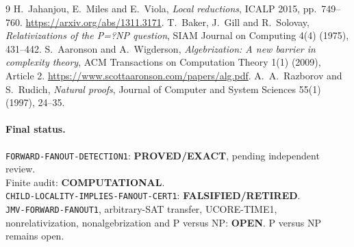 \documentclass[11pt]{article}
\newcommand{\EXACT}{\textbf{PROVED/EXACT}}
\newcommand{\OPEN}{\textbf{OPEN}}
\newcommand{\RETIRED}{\textbf{FALSIFIED/RETIRED}}
\newcommand{\COMP}{\textbf{COMPUTATIONAL}}
\begin{document}
\begin{thebibliography}{9}
 H.~Jahanjou, E.~Miles and E.~Viola,
\emph{Local reductions}, ICALP 2015, pp.~749--760.
\url{https://arxiv.org/abs/1311.3171}.
 T.~Baker, J.~Gill and R.~Solovay,
\emph{Relativizations of the P=?NP question}, SIAM Journal on Computing
4(4) (1975), 431--442.
 S.~Aaronson and A.~Wigderson,
\emph{Algebrization: A new barrier in complexity theory}, ACM Transactions
on Computation Theory 1(1) (2009), Article 2.
\url{https://www.scottaaronson.com/papers/alg.pdf}.
 A.~A.~Razborov and S.~Rudich,
\emph{Natural proofs}, Journal of Computer and System Sciences 55(1)
(1997), 24--35.
\end{thebibliography}

\paragraph{Final status.}
\texttt{FORWARD-FANOUT-DETECTION1}: \EXACT, pending independent review.\\
Finite audit: \COMP.\\
\texttt{CHILD-LOCALITY-IMPLIES-FANOUT-CERT1}: \RETIRED.\\
\texttt{JMV-FORWARD-FANOUT1}, arbitrary-SAT transfer, UCORE-TIME1,
nonrelativization, nonalgebrization and P versus NP: \OPEN.
P versus NP remains open.

\end{document}
